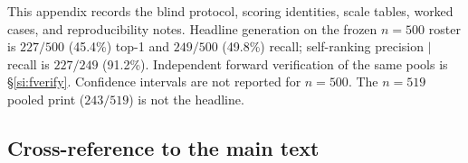\setcounter{figure}{0}
\setcounter{table}{0}
\setcounter{equation}{0}
\renewcommand{\thefigure}{S\arabic{figure}}
\renewcommand{\thetable}{S\arabic{table}}
\renewcommand{\theequation}{S\arabic{equation}}
\renewcommand{\theHfigure}{S\arabic{figure}}
\renewcommand{\theHtable}{S\arabic{table}}
\renewcommand{\theHequation}{S\arabic{equation}}
\makeatletter
\DeclareRobustCommand{\mainref}[2]{\@ifundefined{r@#1}{#2}{\ref{#1}}}
\providecommand{\captionof}[1]{\def\@captype{#1}\caption}
\makeatother

\noindent
This appendix records the blind protocol, scoring identities, scale
tables, worked cases, and reproducibility notes.
Headline generation on the frozen $n{=}500$ roster is $227/500$ (45.4\%)
top-1 and $249/500$ (49.8\%) recall; self-ranking precision $|$ recall is
$227/249$ (91.2\%).
Independent forward verification of the same pools is \S\ref{si:fverify}.
Confidence intervals are not reported for $n{=}500$.
The $n{=}519$ pooled print ($243/519$) is not the headline.

\subsection{Cross-reference to the main text}
\label{si:map}

